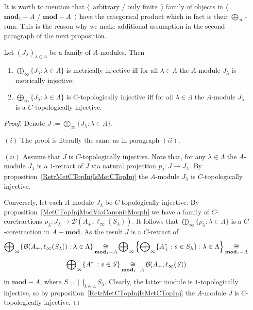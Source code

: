 It is worth to mention that $\langle$~arbitrary / only finite~$\rangle$ family
of objects in $\langle$~$\mathbf{mod}_1-A$ / $\mathbf{mod}-A$~$\rangle$ have the
categorical product which in fact is their $\bigoplus_\infty$-sum. This is the
reason why we make additional assumption in the second paragraph of the next
proposition.

\begin{proposition}\label{MetTopInjModProd} Let
${(J_\lambda)}_{\lambda\in\Lambda}$ be a family of $A$-modules. Then 

\begin{enumerate}[label = (\roman*)]
    \item $\bigoplus_\infty \{J_\lambda:\lambda\in\Lambda \}$ is metrically
    injective iff for all $\lambda\in\Lambda$ the $A$-module $J_\lambda$ is
    metrically injective;

    \item $\bigoplus_\infty \{J_\lambda:\lambda\in\Lambda \}$ is
    $C$-topologically injective iff for all $\lambda\in\Lambda$ the $A$-module
    $J_\lambda$ is a $C$-topologically injective.
\end{enumerate}
\end{proposition}
\begin{proof} Denote $J:=\bigoplus_\infty \{J_\lambda:\lambda\in\Lambda \}$.

$(i)$ The proof is literally the same as in paragraph $(ii)$.

$(ii)$ Assume that $J$ is $C$-topologically injective. Note that, for any
$\lambda\in\Lambda$ the $A$-module $J_\lambda$ is a $1$-retract of $J$ via
natural projection $p_\lambda:J\to J_\lambda$. By
proposition~\ref{RetrMetCTopInjIsMetCTopInj} the $A$-module $J_\lambda$ is
$C$-topologically injective.

Conversely, let each $A$-module $J_\lambda$ be $C$-topologically injective. By
proposition~\ref{MetCTopInjModViaCanonicMorph} we have a family of
$C$-coretractions
$\rho_\lambda:J_\lambda\to\mathcal{B}(A_+,\ell_\infty(S_\lambda))$. It follows
that $\bigoplus_\infty \{\rho_\lambda:\lambda\in\Lambda \}$ is a
$C$-coretraction in $A-\mathbf{mod}$. As the result $J$ is a $C$-retract of 
$$
\bigoplus\nolimits_\infty \{
    \mathcal{B}(A_+,\ell_\infty(S_\lambda)):\lambda\in\Lambda
 \}
\mathop{\mathbin{\cong}}\limits_{\mathbf{mod}_1-A}
\bigoplus\nolimits_\infty\left \{
    \bigoplus\nolimits_\infty \{ A_+^*:s\in S_\lambda \}:\lambda\in\Lambda
\right \}
\mathop{\mathbin{\cong}}\limits_{\mathbf{mod}_1-A}
$$
$$
\bigoplus\nolimits_\infty \{A_+^*:s\in S \}
\mathop{\mathbin{\cong}}\limits_{\mathbf{mod}_1-A}
\mathcal{B}(A_+,\ell_\infty(S))
$$
in $\mathbf{mod}-A$, where $S=\bigsqcup_{\lambda\in\Lambda}S_\lambda$. Clearly,
the latter module is $1$-topologically injective, so by
proposition~\ref{RetrMetCTopInjIsMetCTopInj} the $A$-module $J$ is $C$-topologically
injective.
\end{proof}

